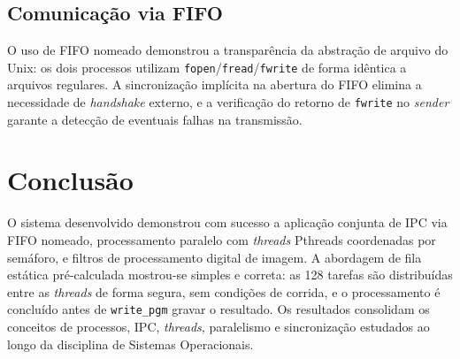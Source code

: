 \documentclass[12 pt]{abntex2}
\begin{document}
\subsection{Comunicação via FIFO}
 
O uso de FIFO nomeado demonstrou a transparência da abstração de arquivo do
Unix: os dois processos utilizam \texttt{fopen}/\texttt{fread}/\texttt{fwrite}
de forma idêntica a arquivos regulares. A sincronização implícita na abertura
do FIFO elimina a necessidade de \textit{handshake} externo, e a verificação
do retorno de \texttt{fwrite} no \textit{sender} garante a detecção de
eventuais falhas na transmissão.

\section{Conclusão}

O sistema desenvolvido demonstrou com sucesso a aplicação conjunta de IPC
via FIFO nomeado, processamento paralelo com \textit{threads} Pthreads
coordenadas por semáforo, e filtros de processamento digital de imagem. A
abordagem de fila estática pré-calculada mostrou-se simples e correta:
as 128 tarefas são distribuídas entre as \textit{threads} de forma segura,
sem condições de corrida, e o processamento é concluído antes de
\texttt{write\_pgm} gravar o resultado. Os resultados consolidam os conceitos
de processos, IPC, \textit{threads}, paralelismo e sincronização estudados
ao longo da disciplina de Sistemas Operacionais.
\end{document}
